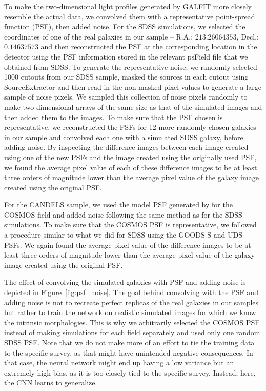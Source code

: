 To make the two-dimensional light profiles generated by GALFIT more closely resemble the actual data, we convolved them with a representative point-spread function (PSF), then added noise. For the SDSS simulations, we selected the coordinates of one of the real galaxies in our sample -- R.A.: $213.26064353$, Decl.: $0.14637573$ and then reconstructed the PSF at the corresponding location in the detector using the PSF information stored in the relevant psField file that we obtained from SDSS. To generate the representative noise, we randomly selected 1000 cutouts from our SDSS sample, masked the sources in each cutout using SourceExtractor \citep{s_extract} and then read-in the non-masked pixel values to generate a large sample of noise pixels. We sampled this collection of noise pixels randomly to make two-dimensional arrays of the same size as that of the simulated images and then added them to the images. To make sure that the PSF chosen is representative, we reconstructed the PSFs for 12 more randomly chosen galaxies in our sample and convolved each one with a simulated SDSS galaxy, before adding noise. By inspecting the difference images between each image created using one of the new PSFs and the image created using the originally used PSF, we found the average pixel value of each of these difference images to be at least three orders of magnitude lower than the average pixel value of the galaxy image created using the original PSF.


For the CANDELS sample, we used the model PSF generated by \citet{vdw_12} for the COSMOS field and added noise following the same method as for the SDSS simulations. To make sure that the COSMOS PSF is representative, we followed a procedure similar to what we did for SDSS using the GOODS-S and UDS PSFs. We again found the average pixel value of the difference images to be at least three orders of magnitude lower than the average pixel value of the galaxy image created using the original PSF. 

The effect of convolving the simulated galaxies with PSF and adding noise is depicted in Figure~\ref{fig:psf_noise}. The goal behind convolving with the PSF and adding noise is not to recreate perfect replicas of the real galaxies in our samples but rather to train the network on realistic simulated images for which we know the intrinsic morphologies. This is why we arbitrarily selected the COSMOS PSF instead of making simulations for each field separately and used only one random SDSS PSF. Note that we do not make more of an effort to tie the training data to the specific survey, as that might have unintended negative consequences. In that case, the neural network might end up having a low variance but an extremely high bias, as it is too closely tied to the specific survey. Instead, here, the CNN learns to generalize.  

